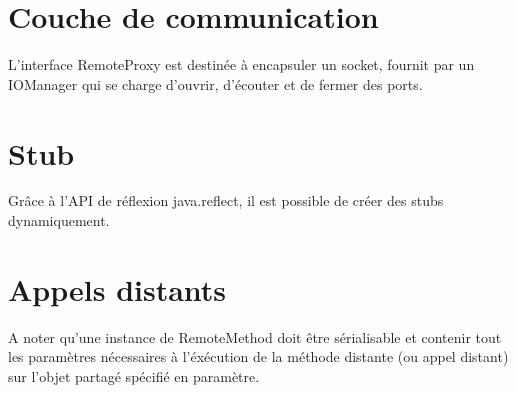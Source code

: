\section{Couche de communication}
L'interface RemoteProxy est destinée à encapsuler un socket, fournit par un IOManager qui se charge d'ouvrir, d'écouter et de fermer des ports.

\section{Stub}
\hspace{-.6cm}Grâce à l'API de réflexion java.reflect, il est possible de créer des stubs dynamiquement.

\section{Appels distants}
A noter qu'une instance de RemoteMethod doit être sérialisable et contenir tout les paramètres nécessaires à l'éxécution de la méthode distante (ou appel distant) sur l'objet partagé spécifié en paramètre.

